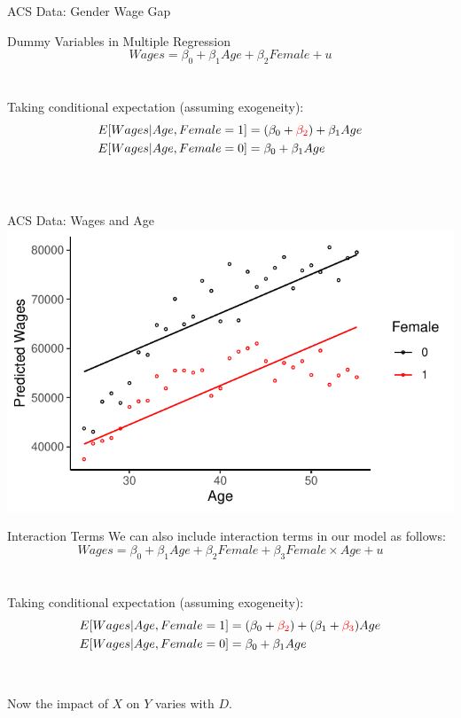 \documentclass{./../div_teaching_slides}
\begin{document}
\begin{frame}{ACS Data: Gender Wage Gap}
\centering  \small \vspace{1.25em}
 \\ \vspace{1.5em}
\end{frame}

\begin{frame}{Dummy Variables in Multiple Regression}
$$ Wages = \beta_0 + \beta_1 Age + \beta_2 Female +  u  $$ \\~\\
Taking conditional expectation (assuming exogeneity):
\begin{align*}
	E[Wages | Age, Female=1] &= (\beta_0+\textcolor{red}{\beta_2}) + \beta_1 Age
 \\
	E[Wages | Age, Female=0] &= \beta_0 + \beta_1 Age
	\end{align*} \\~\\
\end{frame}

\begin{frame}{ACS Data: Wages and Age}
\centering  \small 
\includegraphics{./../../output/fit_gender_age.pdf} \\ \vspace{1.5em}
\end{frame}

\begin{frame}{Interaction Terms}
We can also include interaction terms in our model as follows:
$$ Wages = \beta_0 + \beta_1 Age + \beta_2 Female + \beta_3 Female \times Age +  u  $$ \\~\\
Taking conditional expectation (assuming exogeneity):
\begin{align*}
	E[Wages | Age, Female=1] &= (\beta_0+\textcolor{red}{\beta_2}) + (\beta_1+\textcolor{red}{\beta_3}) Age
 \\
	E[Wages | Age, Female=0] &= \beta_0 + \beta_1 Age
	\end{align*} \\~\\
Now the impact of $X$ on $Y$ varies with $D$.
\end{frame}
\end{document}
